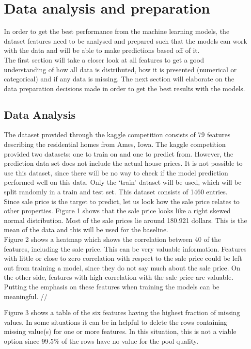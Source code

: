 \documentclass[a4paper,11pt]{article}
\begin{document}
\section{Data analysis and preparation}
In order to get the best performance from the machine learning models, the dataset features need to be analysed and prepared such that the models can work with the data and will be able to make predictions based off of it. \\
\indent The first section will take a closer look at all features to get a good understanding of how all data is distributed, how it is presented (numerical or categorical) and if any data is missing. The next section will elaborate on the data preparation decisions made in order to get the best results with the models.


\subsection{Data Analysis}
The dataset provided through the kaggle competition consists of 79 features describing the residential homes from Ames, Iowa. The kaggle competition provided two datasets: one to train on and one to predict from. However, the prediction data set does not include the actual house prices. It is not possible to use this dataset, since there will be no way to check if the model prediction performed well on this data. Only the ‘train’ dataset will be used, which will be split randomly in a train and test set. This dataset consists of 1460 entries. \\
Since sale price is the target to predict, let us look how the sale price relates to other properties. Figure 1 shows that the sale price looks like a right skewed normal distribution. Most of the sale prices lie around 180.921 dollars. This is the mean of the data and this will be used for the baseline. \\
Figure 2 shows a heatmap which shows the correlation between 40 of the features, including the sale price. This can be very valuable information. Features with little or close to zero correlation with respect to the sale price could be left out from training a model, since they do not say much about the sale price. On the other side, features with high correlation with the sale price are valuable. Putting the emphasis on these features when training the models can be meaningful. //

Figure 3 shows a table of the six features having the highest fraction of missing values. In some situations it can be in helpful to delete the rows containing missing value(s) for one or more features. In this situation, this is not a viable option since 99.5\% of the rows have no value for the pool quality.
\end{document}
